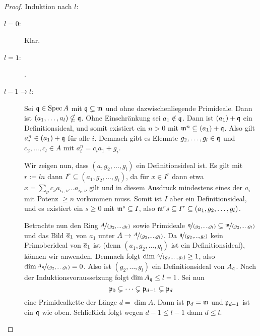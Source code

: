 \documentclass[12pt,a4paper]{scrartcl}
\theoremstyle{cplain}
\theoremstyle{cdef}
\begin{document}
\begin{proof}
	Induktion nach $l$:
	\begin{description}
		\item[$l = 0$:] Klar.
		\item[$l = 1$:] .
		\item[$l-1\to l$:] Sei $\mathfrak{q}\in \operatorname{Spec} A$ mit $\mathfrak{q} \subsetneq \mathfrak{m}$ und ohne dazwischenliegende Primideale. Dann ist $(a_1,\dots, a_l)\nsubseteq \mathfrak{q}$. Ohne Einschränkung sei $a_1\notin \mathfrak{q}$. Dann ist $(a_1)+\mathfrak{q}$ ein Definitionsideal, und somit existiert ein $n>0$ mit $\mathfrak{m}^n \subseteq (a_1)+\mathfrak{q}$. Also gilt $a_i^n \in (a_1)+\mathfrak{q}$ für alle $i$. Demnach gibt es Elemnte $g_2,\dots, g_l\in\mathfrak{q}$ und $c_2,\dots, c_l\in A$ mit $a_i^n = c_ia_1+g_i$.
		
		Wir zeigen nun, dass $(a, g_2,\dots, g_l)$ ein Definitionsideal ist. Es gilt mit $r := ln$ dann $I^r \subseteq (a_1,g_2,\ldots,g_l)$, da für $x \in I^r$ dann etwa $x= \sum_\nu c_\nu a_{i_1,\nu}\ldots a_{i_r,\nu}$ gilt und in diesem Ausdruck mindestens eines der $a_i$ mit Potenz $\ge n$ vorkommen muss. Somit ist $I$ aber ein Definitionsideal, und es existiert ein $s \ge 0$ mit $\mathfrak{m}^s \subseteq I$, also $\mathfrak{m}^rs \subseteq I^r \subseteq (a_1,g_2,\ldots,g_l)$.
		
		Betrachte nun den Ring $\nicefrac{A}{(g_2,\dots, g_l)}$ sowie Primideale $\nicefrac{\mathfrak{q}}{(g_2,\dots, g_l)}\subsetneq \nicefrac{\mathfrak{m}}{(g_2,\dots, g_l)}$ und das Bild $\overline a_1$ von $a_1$ unter $A\to \nicefrac{A}{(g_2,\dots, g_l)}$. Da $\nicefrac{\mathfrak{q}}{(g_2,\dots, g_l)}$ kein Primoberideal von $\overline a_1$ ist (denn $(a_1,g_2,\dots, g_l)$ ist ein Definitionsideal), können wir  anwenden. Demnach folgt $\dim \nicefrac{A}{(g_2,\dots, g_l)}\ge 1$, also $\dim \nicefrac{A_{\mathfrak{q}}}{(g_2,\dots, g_l)} = 0$. Also ist $(g_2,\dots, g_l)$ ein Definitionsideal von $A_{\mathfrak{q}}$. Nach der Induktionsvoraussetzung folgt $\dim A_{\mathfrak{q}}\le l-1$. Sei nun \[\mathfrak{p}_0\subsetneq \dots \subsetneq \mathfrak{p}_{d-1}\subsetneq\mathfrak{p}_d\] eine Primidealkette der Länge $d = \dim A$. Dann ist $\mathfrak{p}_d = \mathfrak{m}$ und $\mathfrak{p}_{d-1}$ ist ein $\mathfrak{q}$ wie oben. Schließlich folgt wegen $d-1\le l-1$ dann $d\le l$.
	\end{description}
\end{proof}
\end{document}
